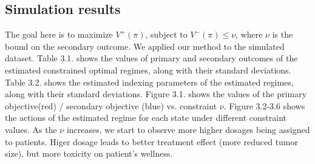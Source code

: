 \subsection{Simulation results}
The goal here is to maximize $V^{+}(\pi)$, subject to  $V^{-}(\pi) \le \nu$, where $\nu$ is the bound on the secondary outcome. We applied our method to the simulated dataset. Table 3.1. shows the values of primary and secondary outcomes of the estimated constrained optimal regimes, along with their standard deviations. Table 3.2. shows the estimated indexing parameters of the estimated regimes, along with their standard deviations. Figure 3.1. shows the values of the primary objective(red) / secondary objective (blue) vs. constraint $\nu$. Figure 3.2-3.6 shows the actions of the estimated regime for each state under different constraint values. As the $\nu$ increases,  we start to observe more higher dosages being assigned to patients. Higer dosage leads to better treatment effect (more reduced tumor size), but more toxicity on patient's wellness. 

